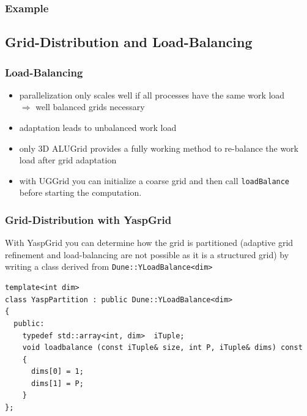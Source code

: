 \documentclass[aspectratio=169,11pt]{beamer}
\theoremstyle{definition}
\begin{document}
\begin{frame} \frametitle{Example}
  
\end{frame}

\subsection{Grid-Distribution and Load-Balancing}
\begin{frame}[fragile]
  \frametitle<presentation>{Load-Balancing}
  \begin{itemize}
  \item parallelization only scales well if all processes have the
    same work load\\
    $\Rightarrow$ well balanced grids necessary
  \item adaptation leads to unbalanced work load
  \item only 3D ALUGrid provides a fully working method to re-balance the work load after grid adaptation
   \item with UGGrid you can initialize a coarse grid and then call \lstinline!loadBalance! before starting the
         computation.
  \end{itemize}
\end{frame}

\begin{frame}[fragile]
  \frametitle{Grid-Distribution with YaspGrid}
With YaspGrid you can determine how the grid is partitioned (adaptive grid refinement and load-balancing are not possible as it is a structured grid) by writing a class derived from
\lstinline!Dune::YLoadBalance<dim>!

\begin{lstlisting}[breaklines=true]
template<int dim>
class YaspPartition : public Dune::YLoadBalance<dim>
{
  public:
    typedef std::array<int, dim>  iTuple;
    void loadbalance (const iTuple& size, int P, iTuple& dims) const
    {
      dims[0] = 1;
      dims[1] = P;
    }
};
\end{lstlisting}
\end{frame}
\end{document}
